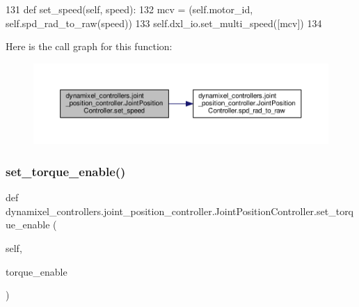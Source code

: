 \begin{DoxyCode}
131     \textcolor{keyword}{def }set\_speed(self, speed):
132         mcv = (self.motor\_id, self.spd\_rad\_to\_raw(speed))
133         self.dxl\_io.set\_multi\_speed([mcv])
134 
\end{DoxyCode}
Here is the call graph for this function\+:
\nopagebreak
\begin{figure}[H]
\begin{center}
\leavevmode
\includegraphics[width=350pt]{d1/df0/classdynamixel__controllers_1_1joint__position__controller_1_1_joint_position_controller_ad5d41a8353d4ddf33d8aa25dc3000efc_cgraph}
\end{center}
\end{figure}
\mbox{\label{classdynamixel__controllers_1_1joint__position__controller_1_1_joint_position_controller_a80d5042e40ee74689971f11c75c738ab}} 
\subsubsection{\texorpdfstring{set\+\_\+torque\+\_\+enable()}{set\_torque\_enable()}}
{\footnotesize\ttfamily def dynamixel\+\_\+controllers.\+joint\+\_\+position\+\_\+controller.\+Joint\+Position\+Controller.\+set\+\_\+torque\+\_\+enable (\begin{DoxyParamCaption}\item[{}]{self,  }\item[{}]{torque\+\_\+enable }\end{DoxyParamCaption})}



